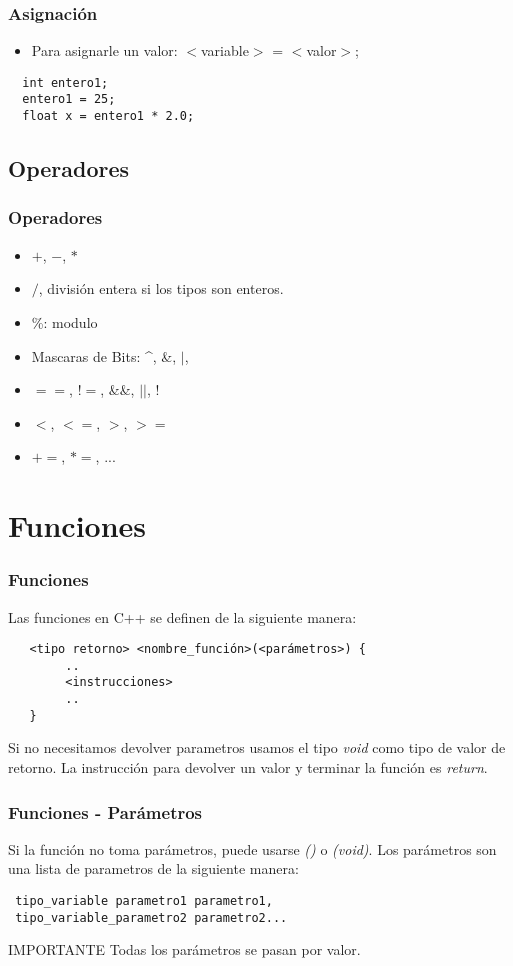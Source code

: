 \documentclass{beamer}
\begin{document}
\begin{frame}[fragile]
\frametitle{Asignación}
\begin{itemize}
 \item Para asignarle un valor: $<$variable$>$ = $<$valor$>$;
\end{itemize}
\begin{verbatim}
  int entero1;
  entero1 = 25;
  float x = entero1 * 2.0;
\end{verbatim}

\end{frame}

\subsection{Operadores}

\begin{frame}
\frametitle{Operadores}
\begin{itemize}
 \item $+$, $-$, $*$
 \item $/$, división entera si los tipos son enteros.
 \item \%: modulo 
 \item Mascaras de Bits: \^{ }, \&, $|$, $~$
 \item $==$, $!=$, \&\&, $||$, $!$
 \item $<$, $<=$, $>$, $>=$
 \item $+=$, $*=$, ...
\end{itemize}

\end{frame}

\section{Funciones}
\begin{frame}[fragile]
\frametitle{Funciones}
Las funciones en C++ se definen de la siguiente manera:
\begin{verbatim}
   <tipo retorno> <nombre_función>(<parámetros>) {
        ..
        <instrucciones>
        ..
   }
\end{verbatim}
Si no necesitamos devolver parametros usamos el tipo \emph{void} como tipo de valor de retorno.
La instrucción para devolver un valor y terminar la función es \emph{return}.
\end{frame}

\begin{frame}[fragile]
\frametitle{Funciones - Parámetros}
Si la función no toma parámetros, puede usarse \emph{()} o \emph{(void)}.
Los parámetros son una lista de parametros de la siguiente manera:
\begin{verbatim}
 tipo_variable parametro1 parametro1, 
 tipo_variable_parametro2 parametro2...
\end{verbatim}
\begin{block}{IMPORTANTE}
 Todas los parámetros se pasan por valor.
\end{block}
\end{frame}
\end{document}
